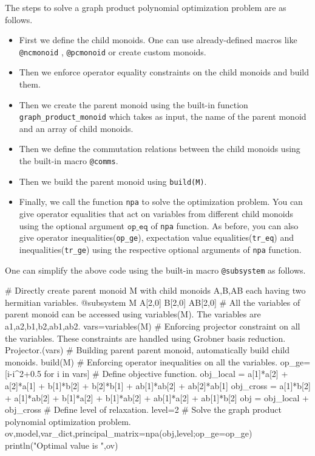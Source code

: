 The steps to solve a graph product polynomial optimization problem are as follows.
\begin{itemize}
    \item First we define the child monoids. One can use already-defined macros like \texttt{@ncmonoid} , \texttt{@pcmonoid} or create custom monoids. 
    \item Then we enforce operator equality constraints on the child monoids and build them.
    \item Then we create the parent monoid using the built-in function \texttt{graph\_product\_monoid} which takes as input, the name of the parent monoid and an array of child monoids.
    \item Then we define the commutation relations between the child monoids using the built-in macro \texttt{@comms}.
    \item Then we build the parent monoid using \texttt{build(M)}.
    \item Finally, we call the function \texttt{npa} to solve the optimization problem. You can give operator equalities that act on variables from different child monoids using the optional argument $\texttt{op\_eq}$ of \texttt{npa} function. As before, you can also give operator inequalities(\texttt{op\_ge}), expectation value equalities(\texttt{tr\_eq}) and inequalities(\texttt{tr\_ge}) using the respective optional arguments of \texttt{npa} function.
\end{itemize}
One can simplify the above code using the built-in macro \texttt{@subsystem} as follows.
\begin{code}
    # Directly create parent monoid M with child monoids A,B,AB each having two hermitian variables.
    @subsystem M A[2,0] B[2,0] AB[2,0]
    # All the variables of parent monoid can be accessed using variables(M). The variables are {a1,a2,b1,b2,ab1,ab2}.
    vars=variables(M)
    # Enforcing projector constraint on all the variables. These constraints are handled using Grobner basis reduction. 
    Projector.(vars)
    # Building parent parent monoid, automatically build child monoids.
    build(M)
    # Enforcing operator inequalities on all the variables.
    op_ge=[i-i^2+0.5 for i in vars]
    # Define objective function.
    obj_local = a[1]*a[2] + a[2]*a[1] + b[1]*b[2] + b[2]*b[1] + ab[1]*ab[2] + ab[2]*ab[1]
    obj_cross = a[1]*b[2] + a[1]*ab[2] + b[1]*a[2] + b[1]*ab[2] + ab[1]*a[2] + ab[1]*b[2]
    obj = obj_local + obj_cross
    # Define level of relaxation.
    level=2
    # Solve the graph product polynomial optimization problem.
    ov,model,var_dict,principal_matrix=npa(obj,level;op_ge=op_ge)
    println("Optimal value is ",ov)
\end{code}